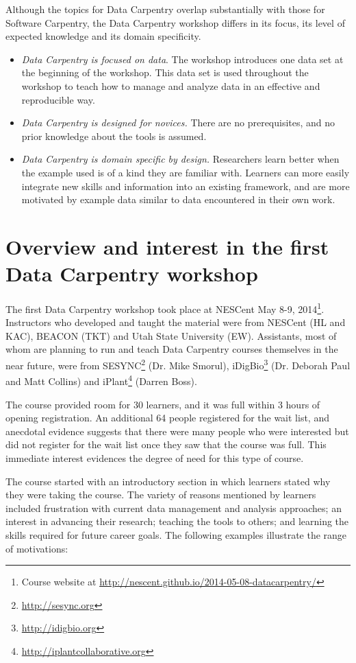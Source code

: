 \documentclass[11pt]{article}
\begin{document}
Although the topics for Data Carpentry overlap substantially with
those for Software Carpentry, the Data Carpentry workshop differs in
its focus, its level of expected knowledge and its domain specificity.
\begin{itemize}
\item \emph{Data Carpentry is focused on data}. The workshop introduces one data set at the beginning of the
workshop. This data set is used throughout the workshop to teach how to manage and analyze data in an effective and reproducible way.
\item \emph{Data Carpentry is designed for novices.} There are no prerequisites, and no 
prior knowledge about the tools is assumed.
\item \emph{Data Carpentry is domain specific by design.} Researchers learn better when the example used is
of a kind they are familiar with. Learners can more easily integrate new skills and information into an existing framework, and 
are more motivated by example data similar to data encountered in their own work.
\end{itemize}

\section{Overview and interest in the first Data Carpentry workshop}

The first Data Carpentry workshop took place at NESCent May 8-9, 2014\footnote{Course website at \url{http://nescent.github.io/2014-05-08-datacarpentry/}}. Instructors who developed and taught the material were from NESCent
(HL and KAC), BEACON (TKT) and Utah State University (EW). Assistants, most of whom are planning to run and teach Data Carpentry courses themselves in the near future, were  from SESYNC\footnote{\url{http://sesync.org}} (Dr. Mike Smorul), iDigBio\footnote{\url{http://idigbio.org}} (Dr. Deborah Paul
and Matt Collins) and iPlant\footnote{\url{http://iplantcollaborative.org}} (Darren Boss).

The course provided room for 30 learners, and it was full within 3 hours of opening registration. An additional 64 people registered for the wait list, and anecdotal evidence suggests that there were many people who were interested but did not register for the wait list once they saw that the course was full. This immediate interest evidences the degree of need for this type of course.

The course started with an introductory section in which learners stated why they were taking the course. The variety of reasons mentioned by learners included frustration with current data management and analysis approaches; an interest in advancing their research; teaching the tools to others; and learning the skills required for future career goals. The following examples illustrate the range of motivations:
\end{document}
